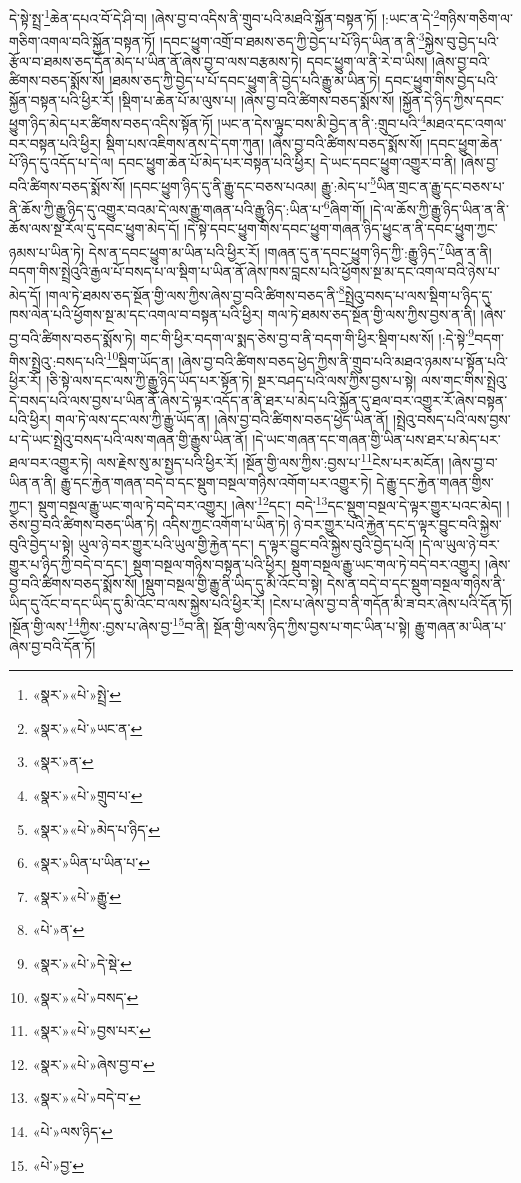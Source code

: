 དེ་སྟེ་སྤྲ་\footnote{«སྣར་»«པེ་»སྤྲེ་}ཆེན་དཔའ་བོ་དེ་ཤི་བ། །ཞེས་བྱ་བ་འདིས་ནི་གྲུབ་པའི་མཐའི་སྐྱོན་བསྟན་ཏོ། །:ཡང་ན་དེ་\footnote{«སྣར་»«པེ་»ཡང་ན་}གཉིས་གཅིག་ལ་གཅིག་འགལ་བའི་སྐྱོན་བསྟན་ཏོ། །དབང་ཕྱུག་འགྲོ་བ་ཐམས་ཅད་ཀྱི་བྱེད་པ་པོ་ཉིད་ཡིན་ན་ནི་\footnote{«སྣར་»ན་}སྐྱེས་བུ་བྱེད་པའི་རྩོལ་བ་ཐམས་ཅད་དོན་མེད་པ་ཡིན་ནོ་ཞེས་བྱ་བ་ལས་བརྩམས་ཏེ། དབང་ཕྱུག་ལ་ནི་རེ་བ་ཡིས། །ཞེས་བྱ་བའི་ཚིགས་བཅད་སྨོས་སོ། །ཐམས་ཅད་ཀྱི་བྱེད་པ་པོ་དབང་ཕྱུག་ནི་བྱེད་པའི་རྒྱུ་མ་ཡིན་ཏེ། དབང་ཕྱུག་གིས་བྱེད་པའི་སྐྱོན་བསྟན་པའི་ཕྱིར་རོ། །སྡིག་པ་ཆེན་པོ་མ་ལུས་པ། །ཞེས་བྱ་བའི་ཚིགས་བཅད་སྨོས་སོ། །སྐྱོན་དེ་ཉིད་ཀྱིས་དབང་ཕྱུག་ཉིད་མེད་པར་ཚིགས་བཅད་འདིས་སྟོན་ཏོ། །ཡང་ན་དེས་ལྟུང་བས་མི་བྱེད་ན་ནི་:གྲུབ་པའི་\footnote{«སྣར་»«པེ་»གྲུབ་པ་}མཐའ་དང་འགལ་བར་བསྟན་པའི་ཕྱིར། སྡིག་པས་འཇིགས་ནས་དེ་དག་ཀུན། །ཞེས་བྱ་བའི་ཚིགས་བཅད་སྨོས་སོ། །དབང་ཕྱུག་ཆེན་པོ་ཉིད་དུ་འདོད་པ་དེ་ལ། དབང་ཕྱུག་ཆེན་པོ་མེད་པར་བསྟན་པའི་ཕྱིར། དེ་ཡང་དབང་ཕྱུག་འགྱུར་བ་ནི། །ཞེས་བྱ་བའི་ཚིགས་བཅད་སྨོས་སོ། །དབང་ཕྱུག་ཉིད་དུ་ནི་རྒྱུ་དང་བཅས་པའམ། རྒྱུ་:མེད་པ་\footnote{«སྣར་»«པེ་»མེད་པ་ཉིད་}ཡིན་གྲང་ན་རྒྱུ་དང་བཅས་པ་ནི་ཆོས་ཀྱི་རྒྱུ་ཉིད་དུ་འགྱུར་བའམ་དེ་ལས་རྒྱུ་གཞན་པའི་རྒྱུ་ཉིད་:ཡིན་པ་\footnote{«སྣར་»ཡིན་པ་ཡིན་པ་}ཞིག་གོ། །དེ་ལ་ཆོས་ཀྱི་རྒྱུ་ཉིད་ཡིན་ན་ནི་ཆོས་ལས་སྔ་རོལ་དུ་དབང་ཕྱུག་མེད་དོ། །དེ་སྟེ་དབང་ཕྱུག་གིས་དབང་ཕྱུག་གཞན་ཉིད་ཕྱུང་ན་ནི་དབང་ཕྱུག་ཀྱང་ཉམས་པ་ཡིན་ཏེ། དེས་ན་དབང་ཕྱུག་མ་ཡིན་པའི་ཕྱིར་རོ། །གཞན་དུ་ན་དབང་ཕྱུག་ཉིད་ཀྱི་:རྒྱུ་ཉིད་\footnote{«སྣར་»«པེ་»རྒྱུ་}ཡིན་ན་ནི། བདག་གིས་སྤྲེའུའི་རྒྱལ་པོ་བསད་པ་ལ་སྡིག་པ་ཡིན་ནོ་ཞེས་ཁས་བླངས་པའི་ཕྱོགས་སྔ་མ་དང་འགལ་བའི་ཉེས་པ་མེད་དོ། །གལ་ཏེ་ཐམས་ཅད་སྔོན་གྱི་ལས་ཀྱིས་ཞེས་བྱ་བའི་ཚིགས་བཅད་ནི་\footnote{«པེ་»ན་}སྤྲེའུ་བསད་པ་ལས་སྡིག་པ་ཉིད་དུ་ཁས་ལེན་པའི་ཕྱོགས་སྔ་མ་དང་འགལ་བ་བསྟན་པའི་ཕྱིར། གལ་ཏེ་ཐམས་ཅད་སྔོན་གྱི་ལས་ཀྱིས་བྱས་ན་ནི། །ཞེས་བྱ་བའི་ཚིགས་བཅད་སྨོས་ཏེ། གང་གི་ཕྱིར་བདག་ལ་སྨད་ཅེས་བྱ་བ་ནི་བདག་གི་ཕྱིར་སྡིག་པས་སོ། །:དེ་སྟེ་\footnote{«སྣར་»«པེ་»དེ་སྡེ་}བདག་གིས་སྤྲེའུ་:བསད་པའི་\footnote{«སྣར་»«པེ་»བསད་}སྡིག་ཡོད་ན། །ཞེས་བྱ་བའི་ཚིགས་བཅད་ཕྱེད་ཀྱིས་ནི་གྲུབ་པའི་མཐའ་ཉམས་པ་སྟོན་པའི་ཕྱིར་རོ། །ཅི་སྟེ་ལས་དང་ལས་ཀྱི་རྒྱུ་ཉིད་ཡོད་པར་སྟོན་ཏེ། སྔར་བཤད་པའི་ལས་ཀྱིས་བྱས་པ་སྟེ། ལས་གང་གིས་སྤྲེའུ་དེ་བསད་པའི་ལས་བྱས་པ་ཡིན་ནོ་ཞེས་དེ་ལྟར་འདོད་ན་ནི་ཐར་པ་མེད་པའི་སྐྱོན་དུ་ཐལ་བར་འགྱུར་རོ་ཞེས་བསྟན་པའི་ཕྱིར། གལ་ཏེ་ལས་དང་ལས་ཀྱི་རྒྱུ་ཡོད་ན། །ཞེས་བྱ་བའི་ཚིགས་བཅད་ཕྱེད་ཡིན་ནོ། །སྤྲེའུ་བསད་པའི་ལས་བྱས་པ་དེ་ཡང་སྤྲེའུ་བསད་པའི་ལས་གཞན་གྱི་རྒྱུས་ཡིན་ནོ། །དེ་ཡང་གཞན་དང་གཞན་གྱི་ཡིན་པས་ཐར་པ་མེད་པར་ཐལ་བར་འགྱུར་ཏེ། ལས་རྗེས་སུ་མ་སྤྱད་པའི་ཕྱིར་རོ། །སྔོན་གྱི་ལས་ཀྱིས་:བྱས་པ་\footnote{«སྣར་»«པེ་»བྱས་པར་}ངེས་པར་མངོན། །ཞེས་བྱ་བ་ཡིན་ན་ནི། རྒྱུ་དང་རྐྱེན་གཞན་བདེ་བ་དང་སྡུག་བསྔལ་གཉིས་འགོག་པར་འགྱུར་ཏེ། དེ་རྒྱུ་དང་རྐྱེན་གཞན་གྱིས་ཀྱང་། སྡུག་བསྔལ་རྒྱུ་ཡང་གལ་ཏེ་བདེ་བར་འགྱུར། །ཞེས་\footnote{«སྣར་»«པེ་»ཞེས་བྱ་བ་}དང་། བདེ་\footnote{«སྣར་»«པེ་»བདེ་བ་}དང་སྡུག་བསྔལ་དེ་ལྟར་གྱུར་པའང་མེད། །ཅེས་བྱ་བའི་ཚིགས་བཅད་ཡིན་ཏེ། འདིས་ཀྱང་འགོག་པ་ཡིན་ཏེ། ཉེ་བར་གྱུར་པའི་རྐྱེན་དང་ད་ལྟར་བྱུང་བའི་སྐྱེས་བུའི་བྱེད་པ་སྟེ། ཡུལ་ཉེ་བར་གྱུར་པའི་ཡུལ་གྱི་རྐྱེན་དང་། ད་ལྟར་བྱུང་བའི་སྐྱེས་བུའི་བྱེད་པའོ། །དེ་ལ་ཡུལ་ཉེ་བར་གྱུར་པ་ཉིད་ཀྱི་བདེ་བ་དང་། སྡུག་བསྔལ་གཉིས་བསྟན་པའི་ཕྱིར། སྡུག་བསྔལ་རྒྱུ་ཡང་གལ་ཏེ་བདེ་བར་འགྱུར། །ཞེས་བྱ་བའི་ཚིགས་བཅད་སྨོས་སོ། །སྡུག་བསྔལ་གྱི་རྒྱུ་ནི་ཡིད་དུ་མི་འོང་བ་སྟེ། དེས་ན་བདེ་བ་དང་སྡུག་བསྔལ་གཉིས་ནི་ཡིད་དུ་འོང་བ་དང་ཡིད་དུ་མི་འོང་བ་ལས་སྐྱེས་པའི་ཕྱིར་རོ། །ངེས་པ་ཞེས་བྱ་བ་ནི་གདོན་མི་ཟ་བར་ཞེས་པའི་དོན་ཏོ། །སྔོན་གྱི་ལས་\footnote{«པེ་»ལས་ཉིད་}ཀྱིས་:བྱས་པ་ཞེས་བྱ་\footnote{«པེ་»བྱ་}བ་ནི། སྔོན་གྱི་ལས་ཉིད་ཀྱིས་བྱས་པ་གང་ཡིན་པ་སྟེ། རྒྱུ་གཞན་མ་ཡིན་པ་ཞེས་བྱ་བའི་དོན་ཏོ། 